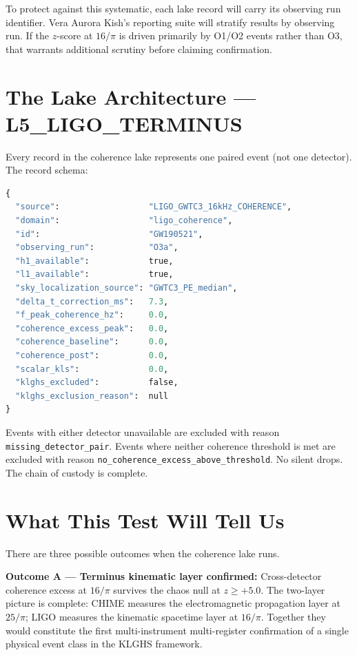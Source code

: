 \documentclass[11pt, letterpaper, openany]{book}
\begin{document}
To protect against this systematic, each lake record will carry its
observing run identifier. Vera Aurora Kish's reporting suite will
stratify results by observing run. If the $z$-score at $16/\pi$ is
driven primarily by O1/O2 events rather than O3, that warrants
additional scrutiny before claiming confirmation.

\section*{The Lake Architecture — L5\_LIGO\_TERMINUS}

Every record in the coherence lake represents one paired event (not
one detector). The record schema:

\begin{lstlisting}[language=Python, basicstyle=\ttfamily\small]
{
  "source":                  "LIGO_GWTC3_16kHz_COHERENCE",
  "domain":                  "ligo_coherence",
  "id":                      "GW190521",
  "observing_run":           "O3a",
  "h1_available":            true,
  "l1_available":            true,
  "sky_localization_source": "GWTC3_PE_median",
  "delta_t_correction_ms":   7.3,
  "f_peak_coherence_hz":     0.0,
  "coherence_excess_peak":   0.0,
  "coherence_baseline":      0.0,
  "coherence_post":          0.0,
  "scalar_kls":              0.0,
  "klghs_excluded":          false,
  "klghs_exclusion_reason":  null
}
\end{lstlisting}

Events with either detector unavailable are excluded with reason
\texttt{missing\_detector\_pair}. Events where neither coherence
threshold is met are excluded with reason
\texttt{no\_coherence\_excess\_above\_threshold}. No silent drops.
The chain of custody is complete.

\section*{What This Test Will Tell Us}

There are three possible outcomes when the coherence lake runs.

\textbf{Outcome A --- Terminus kinematic layer confirmed:}
Cross-detector coherence excess at $16/\pi$ survives the chaos null
at $z \geq +5.0$. The two-layer picture is complete: CHIME measures
the electromagnetic propagation layer at $25/\pi$; LIGO measures the
kinematic spacetime layer at $16/\pi$. Together they would constitute
the first multi-instrument multi-register confirmation of a single
physical event class in the KLGHS framework.
\end{document}
